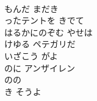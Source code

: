 \documentclass[10pt,b5j]{tarticle} %
\begin{document}
\begin{enumerate}
\begin{minipage}[c]{\blocksize}
        \vspace{\linespace}
        \item~\\
        もんだ まだき\\
        ったテントを きでて\\
        はるかにのぞむ やせは\\
        けゆる ペテガリだ\\
        いざこう がよ\\
        のに アンザイレン\\
        のの\\
        き そうよ
    
    \end{minipage}
\end{enumerate} %
\end{document}
